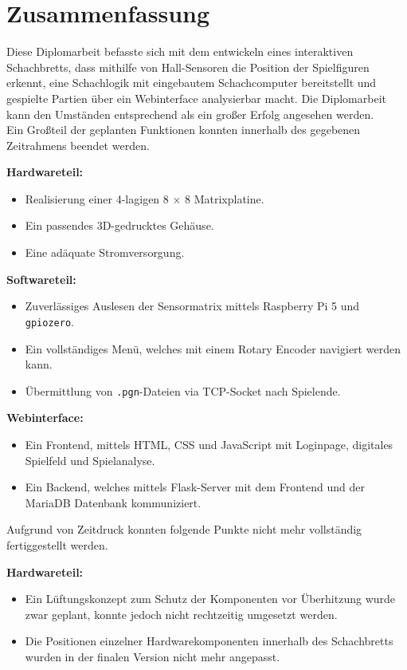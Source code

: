 \chapter{Zusammenfassung}

Diese Diplomarbeit befasste sich mit dem entwickeln eines interaktiven Schachbretts, dass mithilfe von Hall-Sensoren 
die Position der Spielfiguren erkennt, eine Schachlogik mit eingebautem Schachcomputer bereitstellt und gespielte 
Partien über ein Webinterface analysierbar macht. Die Diplomarbeit kann den Umständen entsprechend als ein großer 
Erfolg angesehen werden.\\

Ein Großteil der geplanten Funktionen konnten innerhalb des gegebenen Zeitrahmens beendet werden.

\textbf{Hardwareteil:}
\begin{itemize}
	\item Realisierung einer 4-lagigen 8 × 8 Matrixplatine.
	\item Ein passendes 3D-gedrucktes Gehäuse.
	\item Eine adäquate Stromversorgung.
\end{itemize}

\textbf{Softwareteil:}
\begin{itemize}
    \item Zuverlässiges Auslesen der Sensormatrix mittels Raspberry Pi 5 und \verb|gpiozero|.
    \item Ein vollständiges Menü, welches mit einem Rotary Encoder navigiert werden kann.
    \item Übermittlung von \verb|.pgn|-Dateien via TCP-Socket nach Spielende.
\end{itemize}

\textbf{Webinterface:}
\begin{itemize}
    \item Ein Frontend, mittels HTML, CSS und JavaScript mit Loginpage, digitales Spielfeld und Spielanalyse.
    \item Ein Backend, welches mittels Flask-Server mit dem Frontend und der MariaDB Datenbank kommuniziert.
\end{itemize}

Aufgrund von Zeitdruck konnten folgende Punkte nicht mehr vollständig fertiggestellt werden.

\textbf{Hardwareteil:}
\begin{itemize}
    \item Ein Lüftungskonzept zum Schutz der Komponenten vor Überhitzung wurde zwar geplant, konnte jedoch nicht rechtzeitig umgesetzt werden.
    \item Die Positionen einzelner Hardwarekomponenten innerhalb des Schachbretts wurden in der finalen Version nicht mehr angepasst.
\end{itemize}

